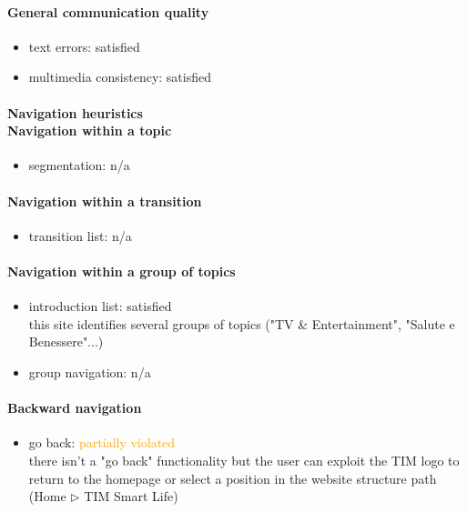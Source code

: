 \begin{enumerate}
	\paragraph*{General communication quality}
	\begin{itemize}
		\item text errors: satisfied
		\item multimedia consistency: satisfied
	\end{itemize}

	\paragraph*{Navigation heuristics \\ Navigation within a topic}
	\begin{itemize}
		\item segmentation: n/a
	\end{itemize}	
	
	\paragraph*{Navigation within a transition}
	\begin{itemize}
		\item transition list: n/a
	\end{itemize}
	
	\paragraph*{Navigation within a group of topics}
	\begin{itemize}
		\item introduction list: satisfied\\
		this site identifies several groups of topics ("TV \& Entertainment", "Salute e Benessere"...)
		\item group navigation: n/a
	\end{itemize}
	
	\paragraph*{Backward navigation}
	\begin{itemize}
		\item go back: \textcolor {orange}{partially violated}\\
		there isn't a "go back" functionality but the user can exploit the TIM logo to return to the homepage or select a position in the website structure path (Home $\triangleright$ TIM Smart Life)
	\end{itemize}
	

\end{enumerate}
